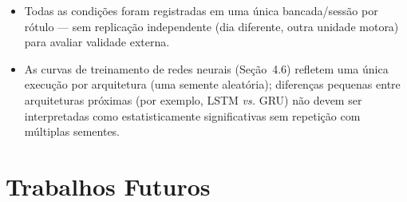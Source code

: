 \documentclass[12pt,a4paper]{report}
\begin{document}
\begin{itemize}
(Seção~\ref{sec:taxonomia}), mas a massa/geometria removida por parafuso não
está documentada neste relatório — informação que ajudaria a explicar a
confusão observada entre graus próximos (Figura~\ref{fig:cm6}).
\item Todas as condições foram registradas em uma única bancada/sessão por
rótulo — sem replicação independente (dia diferente, outra unidade motora)
para avaliar validade externa.
\item As curvas de treinamento de redes neurais (Seção~4.6) refletem uma
única execução por arquitetura (uma semente aleatória); diferenças pequenas
entre arquiteturas próximas (por exemplo, LSTM \emph{vs.} GRU) não devem ser
interpretadas como estatisticamente significativas sem repetição com
múltiplas sementes.
\end{itemize}

\chapter{Trabalhos Futuros}
\end{document}
